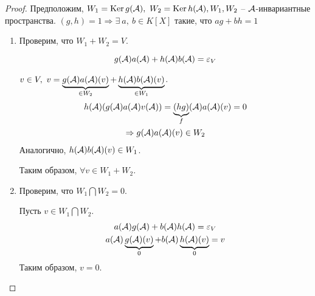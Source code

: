 \documentclass[main]{subfiles}
\begin{document}
\begin{proof}
    Предположим, $W_1 = \operatorname{Ker} g(\mathcal{A}), \ W_2 = \operatorname{Ker} h(\mathcal{A}),
        W_1, W_2$ -- $\mathcal{A}$-инвариантные пространства.
    $(g, h) = 1 \Rightarrow \exists \ a, \ b \in K[X]$ такие, что $ag+bh = 1$

    \begin{enumerate}
        \item Проверим, что $W_1 + W_2 = V$.

              \[g(\mathcal{A})a(\mathcal{A}) + h(\mathcal{A})b(\mathcal{A}) = \varepsilon_V\]

              $v \in V, \ v = \underbrace{g(\mathcal{A})a(\mathcal{A})(v)}_{\in W_2} + \underbrace{h(\mathcal{A})b(\mathcal{A})(v)}_{\in W_1}$.
              \begin{gather*}
                  h(\mathcal{A})(g(\mathcal{A})a(\mathcal{A})v(\mathcal{A})) = \underbrace{(hg)}_{f}(\mathcal{A})a(\mathcal{A})(v) = 0 \\
                  \Rightarrow g(\mathcal{A})a(\mathcal{A})(v) \in W_2
              \end{gather*}
              Аналогично, $h(\mathcal{A})b(\mathcal{A})(v) \in W_1$.

              Таким образом, $\forall v \in W_1 + W_2$.
        \item Проверим, что $W_1 \bigcap W_2 = 0$.

              Пусть $v \in W_1 \bigcap W_2$.
              \begin{gather*}
                  a(\mathcal{A})g(\mathcal{A}) + b(\mathcal{A})h(\mathcal{A}) = \varepsilon_V \\
                  a(\mathcal{A})\underbrace{g(\mathcal{A})(v)}_{0} + b(\mathcal{A})\underbrace{h(\mathcal{A})(v)}_{0} = v
              \end{gather*}
              Таким образом, $v = 0$.
    \end{enumerate}
\end{proof}
\end{document}
